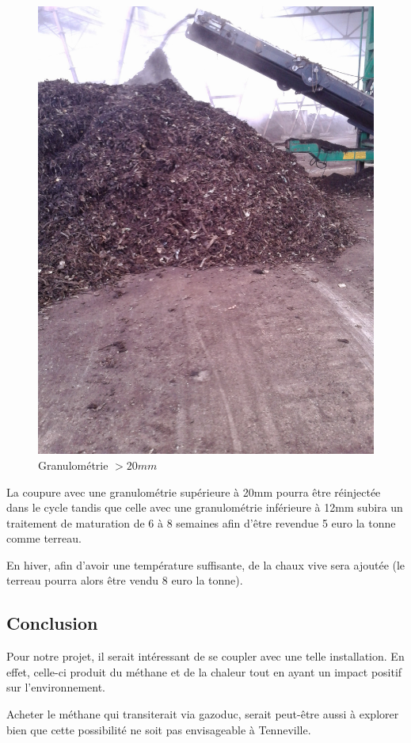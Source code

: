 \begin{figure}
  \centering
  \includegraphics[scale=0.07]{task7/tenneville/IMG_20141105_103019.jpg}
  \caption{Granulométrie $> \unit{20}{mm}$}
  \label{fig:granumore20}
\end{figure}
La coupure avec une granulométrie supérieure à \unit{20}{mm} pourra être réinjectée dans le cycle tandis que celle avec une granulométrie inférieure à \unit{12}{mm} subira un traitement de maturation de 6 à 8 semaines afin d'être revendue 5 euro la tonne comme terreau.

En hiver, afin d'avoir une température suffisante, de la chaux vive sera ajoutée (le terreau pourra alors être vendu 8 euro la tonne).
\subsection{Conclusion}
Pour notre projet, il serait intéressant de se coupler avec une telle installation. En effet, celle-ci produit du méthane et de la chaleur tout en ayant un impact positif sur l'environnement.

Acheter le méthane qui transiterait via gazoduc, serait peut-être aussi à explorer bien que cette possibilité ne soit pas envisageable à Tenneville.